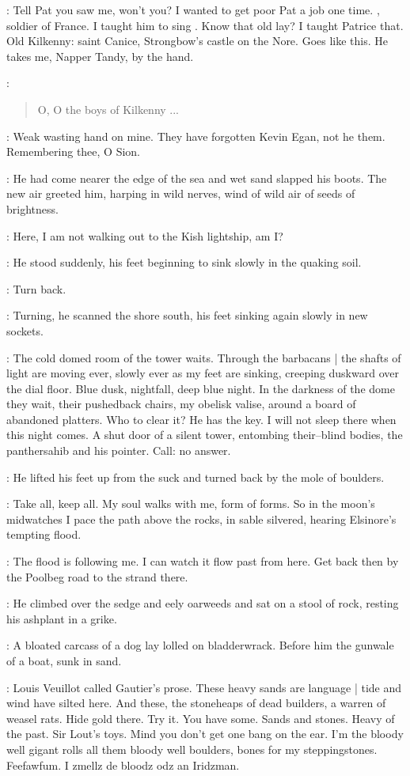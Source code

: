 \kevin:
Tell Pat you saw me, won't you?
I wanted to get poor Pat a job one time.
, soldier of France.
I taught him to sing
.
Know that old lay?
I taught Patrice that.
Old Kilkenny:
saint Canice, Strongbow's castle on the Nore.
Goes like this.
He takes me, Napper Tandy, by the hand.

\kevin:
\begin{verse}
    O, O the boys of Kilkenny ...
\end{verse}

\StephenInt:
Weak wasting hand on mine.
They have forgotten Kevin Egan,
not he them.
Remembering thee, O Sion.

:
He had come nearer the edge of the sea and wet sand slapped his boots.
The new air greeted him, harping in wild nerves,
wind of wild air
of seeds of brightness.

\StephenInt:
Here,
I am not walking out to the Kish lightship,
am I?

:
He stood suddenly,
his feet beginning to sink slowly in the quaking soil.

\StephenInt:
Turn back.

:
Turning, he scanned the shore south,
his feet sinking again slowly in new sockets.

\StephenInt:
The cold domed room of the tower waits.
Through the barbacans |
the shafts of light are moving ever,
slowly ever as my feet are sinking,
creeping duskward over the dial floor.
Blue dusk, nightfall, deep blue night.
In the darkness of the dome
they wait, their pushedback chairs,
my obelisk valise,
around a board of abandoned platters.
Who to clear it?
He has the key.
I will not sleep there when this night comes.
A shut door of a silent tower,
entombing their--blind bodies,
the panthersahib and his pointer.
Call:
no answer.

:
He lifted his feet up from the suck
and turned back by the mole of boulders.

\StephenInt:
Take all, keep all.
My soul walks with me, form of forms.
So in the moon's midwatches
I pace the path above the rocks,
in sable silvered, hearing Elsinore's tempting flood.

\StephenInt:
The flood is following me.
I can watch it flow past from here.
Get back then by the Poolbeg road to the strand there.

:
He climbed over the sedge and eely oarweeds
and sat on a stool of rock, resting his ashplant in a grike.

:
A bloated carcass of a dog lay lolled on bladderwrack.
Before him the gunwale of a boat, sunk in sand.

\StephenInt:
 Louis Veuillot called Gautier's prose.
These heavy sands are language |
tide and wind have silted here.
And these, the stoneheaps of dead builders, a warren of weasel rats.
Hide gold there.
Try it.
You have some.
Sands and stones.
Heavy of the past.
Sir Lout's toys.
Mind you don't get one bang on the ear.
I'm the bloody well gigant
rolls all them bloody well boulders,
bones for my steppingstones.
Feefawfum.
I zmellz de bloodz odz an Iridzman.
